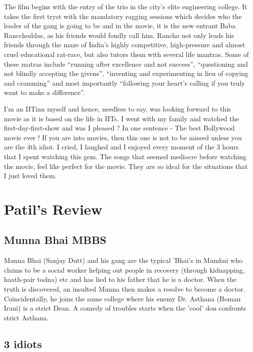 \documentclass{article}
\begin{document}
The film begins with the entry of the trio in the city's elite engineering college. It takes the first tryst with the mandatory ragging sessions which decides who the leader of the gang is going to be and in the movie, it is the new entrant Baba Rancchoddas, as his friends would fondly call him. Rancho not only leads his friends through the maze of India's highly competitive, high-pressure and almost cruel educational rat-race, but also tutors them with several life mantras. Some of these matras include ``running after excellence and not success'', ``questioning and not blindly accepting the givens'', ``inventing and experimenting in lieu of copying and cramming'' and most importantly ``following your heart's calling if you truly want to make a difference''.


I'm an IITian myself and hence, needless to say, was looking forward to this movie as it is based on the life in IITs. I went with my family and watched the first-day-first-show and was I pleased ? In one sentence - The best Bollywood movie ever ! If you are into movies, then this one is not to be missed unless you are the 4th idiot. I cried, I laughed and I enjoyed every moment of the 3 hours that I spent watching this gem. The songs that seemed mediocre before watching the movie, feel like perfect for the movie. They are so ideal for the situations that I just loved them.


\section{Patil's Review}

\subsection{Munna Bhai MBBS}

 Munna Bhai (Sanjay Dutt) and his gang are the typical 'Bhai's in Mumbai who claims to be a social worker helping out people in recovery (through kidnapping, haath-pair todna) etc and has lied to his father that he is a doctor. When the truth is discovered, an insulted Munna then makes a resolve to become a doctor. Coincidentally, he joins the same college where his enemy Dr. Asthana (Boman Irani) is a strict Dean. A comedy of troubles starts when the 'cool' don confronts strict Asthana.

\subsection{3 idiots}
\end{document}

